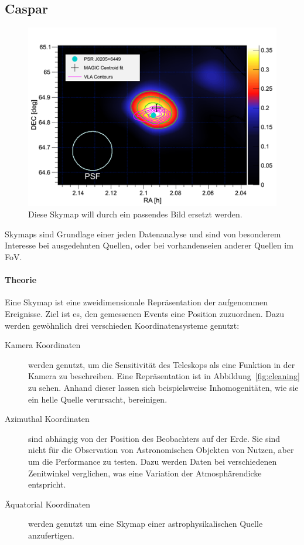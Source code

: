 \subsection{Caspar}%
\label{sub:caspar}

\begin{figure}
    \centering
    \includegraphics[width=\linewidth]{pictures/skymap.png}
    \caption{Diese Skymap will durch ein passendes Bild ersetzt werden.}%
    \label{fig:skymap}
\end{figure}

Skymaps sind Grundlage einer jeden Datenanalyse
und sind von besonderem Interesse bei ausgedehnten Quellen, 
oder bei vorhandenseien anderer Quellen im FoV.

\paragraph{Theorie}%
\label{par:theorie}

Eine Skymap ist eine zweidimensionale Repräsentation der aufgenommen Ereignisse.
Ziel ist es, den gemessenen Events eine Position zuzuordnen.
Dazu werden ge\-wöhn\-lich drei verschieden Koordinatensysteme genutzt:

\begin{description}
	\item[\quad Kamera Koordinaten] werden genutzt, um die Sensitivität des
    Teleskops
		als eine Funktion in der Kamera zu beschreiben.
    Eine Repräsentation ist in Abbildung~\ref{fig:cleaning} zu sehen.
		Anhand dieser lassen sich beispielsweise Inhomogenitäten,
		wie sie ein helle Quelle verursacht, bereinigen.

	\item[\quad Azimuthal Koordinaten] sind abhängig von der Position des
		Beobachters auf der Erde.
		Sie sind nicht für die Observation von Astronomischen Objekten von Nutzen,
		aber um die Performance zu testen.
		Dazu werden Daten bei verschiedenen Zenitwinkel verglichen,
    was eine Variation der Atmosphärendicke entspricht.

	\item[\quad Äquatorial Koordinaten] werden genutzt um eine Skymap einer
		astrophysikalischen Quelle anzufertigen.
\end{description}

